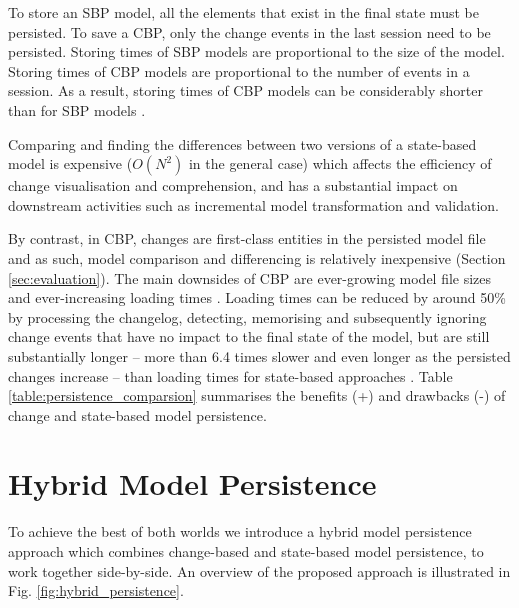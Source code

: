 \documentclass{llncs}
\begin{document}
To store an SBP model, all the elements that exist in the final state must be persisted. To save a CBP, only the change events in the last session need to be persisted. Storing times of SBP models are proportional to the size of the model. Storing times of CBP models are proportional to the number of events in a session. As a result, storing times of CBP models can be considerably shorter than for SBP models \cite{yohannis2018towards}. %

Comparing and finding the differences between two versions of a state-based model is expensive \cite{Kolovos:2009:DMM:1564596.1564641} ($O(N^2)$ in the general case) %
which affects the efficiency of change visualisation and comprehension, and has a substantial impact on downstream activities such as incremental model transformation \cite{DBLP:conf/ecmdafa/OgunyomiRK15} and validation.

By contrast, in CBP, changes are first-class entities in the persisted model file and as such, model comparison and differencing is relatively inexpensive (Section \ref{sec:evaluation}). The main downsides of CBP are ever-growing model file sizes \cite{DBLP:journals/entcs/RobbesL07,DBLP:conf/edoc/KoegelHLHD10} and ever-increasing loading times \cite{mens2002state}. Loading times can be reduced by around 50\% by processing the changelog, detecting, memorising and subsequently ignoring change events that have no impact to the final state of the model, but are still substantially longer -- more than 6.4 times slower and even longer as the persisted changes increase -- than loading times for state-based approaches \cite{yohannis2018towards}. Table \ref{table:persistence_comparsion} summarises the benefits (+) and drawbacks (-) of change and state-based model persistence.

\section{Hybrid Model Persistence}
\label{sec:hybrid_model_persistence}
To achieve the best of both worlds we introduce a hybrid model persistence approach which combines change-based and state-based model persistence, to work together side-by-side. An overview of the proposed approach is illustrated in Fig. \ref{fig:hybrid_persistence}.
\end{document}
